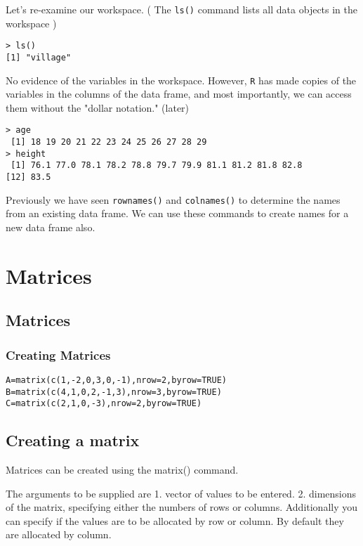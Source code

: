 \documentclass[a4paper,12pt]{article}
\begin{document}
Let's re-examine our workspace. ( The \texttt{ls()} command lists all data objects in the workspace )
\begin{verbatim}
> ls()
[1] "village"
\end{verbatim}


No evidence of the variables in the workspace. However, \texttt{R} has made copies of the variables in the columns of the data frame, and most importantly, we can access them without the "dollar notation." (later)
\begin{verbatim}
> age
 [1] 18 19 20 21 22 23 24 25 26 27 28 29
> height
 [1] 76.1 77.0 78.1 78.2 78.8 79.7 79.9 81.1 81.2 81.8 82.8
[12] 83.5
\end{verbatim}

Previously we have seen \texttt{rownames()} and \texttt{colnames()} to determine the names from an existing data frame. We can use these commands to create names for a new data frame also.


\section{Matrices}
\subsection{Matrices}
\subsubsection{Creating Matrices}
\begin{verbatim}
A=matrix(c(1,-2,0,3,0,-1),nrow=2,byrow=TRUE)
B=matrix(c(4,1,0,2,-1,3),nrow=3,byrow=TRUE)
C=matrix(c(2,1,0,-3),nrow=2,byrow=TRUE)
\end{verbatim}

\subsection{Creating a matrix}
Matrices can be created using the matrix() command.

The arguments to be supplied are
1. vector of values to be entered.
2. dimensions of the matrix, specifying either the numbers of rows or columns.
Additionally you can specify if the values are to be allocated by row or column. By default they are allocated by column.
\end{document}
